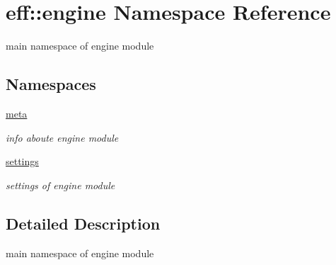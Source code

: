 \hypertarget{namespaceeff_1_1engine}{}\section{eff\+:\+:engine Namespace Reference}
\label{namespaceeff_1_1engine}


main namespace of engine module  


\subsection*{Namespaces}
\begin{DoxyCompactItemize}
\item 
 \hyperlink{namespaceeff_1_1engine_1_1meta}{meta}
\begin{DoxyCompactList}\small\item\em info aboute engine module \end{DoxyCompactList}\item 
 \hyperlink{namespaceeff_1_1engine_1_1settings}{settings}
\begin{DoxyCompactList}\small\item\em settings of engine module \end{DoxyCompactList}\end{DoxyCompactItemize}


\subsection{Detailed Description}
main namespace of engine module 